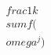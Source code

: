 \documentclass[preview]{standalone}
\begin{document}
\begin{align*}
\quad\\frac{1}{k} \quad\\sum f(\quad\\omega^j)
\end{align*}
\end{document}
